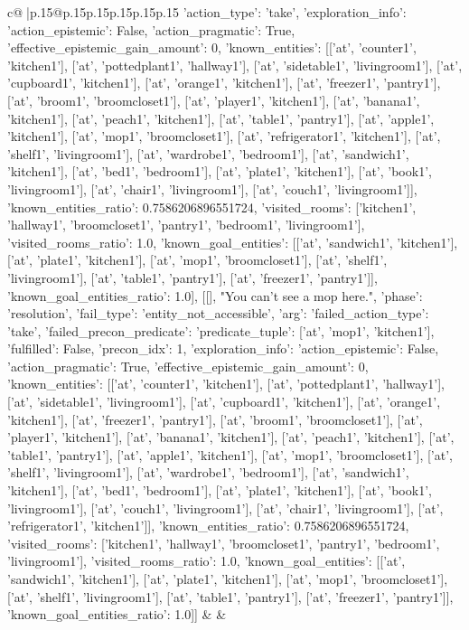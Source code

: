 \documentclass{article}
\begin{document}
{\begin{supertabular}{c@{$\;$}|p{.15\linewidth}@{}p{.15\linewidth}p{.15\linewidth}p{.15\linewidth}p{.15\linewidth}p{.15\linewidth}}
{{{{'action_type': 'take', 'exploration_info': {'action_epistemic': False, 'action_pragmatic': True, 'effective_epistemic_gain_amount': 0, 'known_entities': [['at', 'counter1', 'kitchen1'], ['at', 'pottedplant1', 'hallway1'], ['at', 'sidetable1', 'livingroom1'], ['at', 'cupboard1', 'kitchen1'], ['at', 'orange1', 'kitchen1'], ['at', 'freezer1', 'pantry1'], ['at', 'broom1', 'broomcloset1'], ['at', 'player1', 'kitchen1'], ['at', 'banana1', 'kitchen1'], ['at', 'peach1', 'kitchen1'], ['at', 'table1', 'pantry1'], ['at', 'apple1', 'kitchen1'], ['at', 'mop1', 'broomcloset1'], ['at', 'refrigerator1', 'kitchen1'], ['at', 'shelf1', 'livingroom1'], ['at', 'wardrobe1', 'bedroom1'], ['at', 'sandwich1', 'kitchen1'], ['at', 'bed1', 'bedroom1'], ['at', 'plate1', 'kitchen1'], ['at', 'book1', 'livingroom1'], ['at', 'chair1', 'livingroom1'], ['at', 'couch1', 'livingroom1']], 'known_entities_ratio': 0.7586206896551724, 'visited_rooms': ['kitchen1', 'hallway1', 'broomcloset1', 'pantry1', 'bedroom1', 'livingroom1'], 'visited_rooms_ratio': 1.0, 'known_goal_entities': [['at', 'sandwich1', 'kitchen1'], ['at', 'plate1', 'kitchen1'], ['at', 'mop1', 'broomcloset1'], ['at', 'shelf1', 'livingroom1'], ['at', 'table1', 'pantry1'], ['at', 'freezer1', 'pantry1']], 'known_goal_entities_ratio': 1.0}}], [[], "You can't see a mop here.", {'phase': 'resolution', 'fail_type': 'entity_not_accessible', 'arg': {'failed_action_type': 'take', 'failed_precon_predicate': {'predicate_tuple': ['at', 'mop1', 'kitchen1'], 'fulfilled': False, 'precon_idx': 1}}, 'exploration_info': {'action_epistemic': False, 'action_pragmatic': True, 'effective_epistemic_gain_amount': 0, 'known_entities': [['at', 'counter1', 'kitchen1'], ['at', 'pottedplant1', 'hallway1'], ['at', 'sidetable1', 'livingroom1'], ['at', 'cupboard1', 'kitchen1'], ['at', 'orange1', 'kitchen1'], ['at', 'freezer1', 'pantry1'], ['at', 'broom1', 'broomcloset1'], ['at', 'player1', 'kitchen1'], ['at', 'banana1', 'kitchen1'], ['at', 'peach1', 'kitchen1'], ['at', 'table1', 'pantry1'], ['at', 'apple1', 'kitchen1'], ['at', 'mop1', 'broomcloset1'], ['at', 'shelf1', 'livingroom1'], ['at', 'wardrobe1', 'bedroom1'], ['at', 'sandwich1', 'kitchen1'], ['at', 'bed1', 'bedroom1'], ['at', 'plate1', 'kitchen1'], ['at', 'book1', 'livingroom1'], ['at', 'couch1', 'livingroom1'], ['at', 'chair1', 'livingroom1'], ['at', 'refrigerator1', 'kitchen1']], 'known_entities_ratio': 0.7586206896551724, 'visited_rooms': ['kitchen1', 'hallway1', 'broomcloset1', 'pantry1', 'bedroom1', 'livingroom1'], 'visited_rooms_ratio': 1.0, 'known_goal_entities': [['at', 'sandwich1', 'kitchen1'], ['at', 'plate1', 'kitchen1'], ['at', 'mop1', 'broomcloset1'], ['at', 'shelf1', 'livingroom1'], ['at', 'table1', 'pantry1'], ['at', 'freezer1', 'pantry1']], 'known_goal_entities_ratio': 1.0}}]] 
	  } 
	   } 
	   } 
	 & & \\ 
 


\end{supertabular}}
\end{document}
